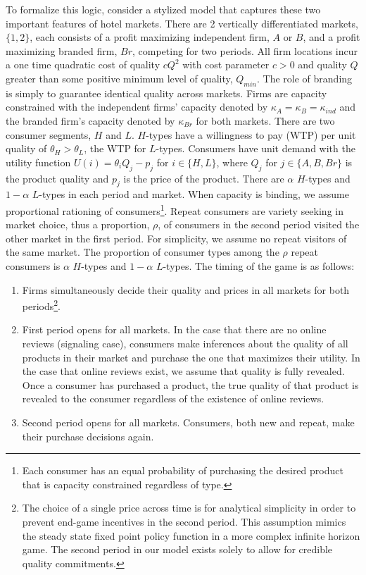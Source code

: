 \documentclass[mksc,blindrev]{informs3} %
\begin{document}
To formalize this logic, consider a  stylized model that captures these two important features of hotel markets. There are 2 vertically differentiated markets, $\{1,2\}$, each consists of a profit maximizing independent firm, $A$ or $B$, and a profit maximizing branded firm, $Br$, competing for two periods. All firm locations incur a one time quadratic cost of quality $cQ^2$ with cost parameter $c>0$ and quality $Q$ greater than some positive minimum level of quality, $Q_{min}$. The role of branding is simply to guarantee identical quality across markets. Firms are capacity constrained with the independent firms' capacity denoted by $\kappa_{A}=\kappa_B=\kappa_{ind}$ and the branded firm's capacity denoted by $\kappa_{Br}$ for both markets. There are two consumer segments, $H$ and $L$. $H$-types have a willingness to pay (WTP) per unit quality of $\theta_H>\theta_L$, the WTP for $L$-types. Consumers have unit demand with the utility function $U(i)=\theta_iQ_j-p_j$ for $i \in\{H,L\}$, where $Q_j$ for $j\in\{A,B,Br\}$ is the product quality and $p_j$ is the price of the product. There are $\alpha$ $H$-types and $1-\alpha$ $L$-types in each period and market. When capacity is binding, we assume proportional rationing of consumers\footnote{Each consumer has an equal probability of purchasing the desired product that is capacity constrained regardless of type.}. Repeat consumers are variety seeking in market choice, thus a proportion, $\rho$, of consumers in the second period visited the other market in the first period. For simplicity, we assume no repeat visitors of the same market. The proportion of consumer types among the $\rho$ repeat consumers is $\alpha$ $H$-types and $1-\alpha$ $L$-types. The timing of the game is as follows:

\begin{enumerate}
\item Firms simultaneously decide their quality and prices in all markets for both periods\footnote{The choice of a single price across time is for analytical simplicity in order to prevent end-game incentives in the second period. This assumption mimics the steady state fixed point policy function in a more complex infinite horizon game. The second period in our model exists solely to allow for credible quality commitments.}. 
  \item First period opens for all markets. In the case that there are no online reviews (signaling case), consumers make inferences about the quality of all products in their market and purchase the one that maximizes their utility. In the case that online reviews exist, we assume that quality is fully revealed. Once a consumer has purchased a product, the true quality of that product is revealed to the consumer regardless of the existence of online reviews.
  \item Second period opens for all markets. Consumers, both new and repeat, make their purchase decisions again.
\end{enumerate}
\end{document}
